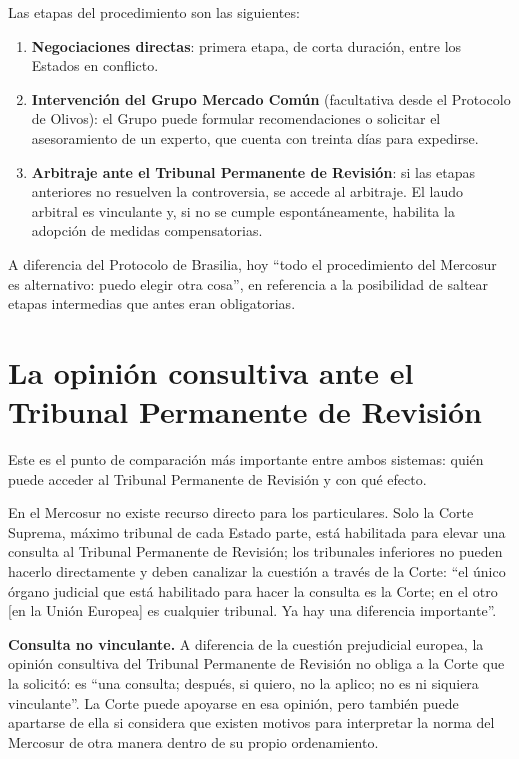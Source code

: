 \documentclass[12pt,oneside]{book}
\begin{document}
Las etapas del procedimiento son las siguientes:

\begin{enumerate}
    \item \textbf{Negociaciones directas}: primera etapa, de corta duración, entre los Estados en conflicto.
    \item \textbf{Intervención del Grupo Mercado Común} (facultativa desde el Protocolo de Olivos): el Grupo puede formular recomendaciones o solicitar el asesoramiento de un experto, que cuenta con treinta días para expedirse.
    \item \textbf{Arbitraje ante el Tribunal Permanente de Revisión}: si las etapas anteriores no resuelven la controversia, se accede al arbitraje. El laudo arbitral es vinculante y, si no se cumple espontáneamente, habilita la adopción de medidas compensatorias.
\end{enumerate}

A diferencia del Protocolo de Brasilia, hoy “todo el procedimiento del Mercosur es alternativo: puedo elegir otra cosa”, en referencia a la posibilidad de saltear etapas intermedias que antes eran obligatorias.

\section{La opinión consultiva ante el Tribunal Permanente de Revisión}

Este es el punto de comparación más importante entre ambos sistemas: quién puede acceder al Tribunal Permanente de Revisión y con qué efecto.

En el Mercosur no existe recurso directo para los particulares. Solo la Corte Suprema, máximo tribunal de cada Estado parte, está habilitada para elevar una consulta al Tribunal Permanente de Revisión; los tribunales inferiores no pueden hacerlo directamente y deben canalizar la cuestión a través de la Corte: “el único órgano judicial que está habilitado para hacer la consulta es la Corte; en el otro [en la Unión Europea] es cualquier tribunal. Ya hay una diferencia importante”.

\begin{important}
\textbf{Consulta no vinculante.} A diferencia de la cuestión prejudicial europea, la opinión consultiva del Tribunal Permanente de Revisión no obliga a la Corte que la solicitó: es “una consulta; después, si quiero, no la aplico; no es ni siquiera vinculante”. La Corte puede apoyarse en esa opinión, pero también puede apartarse de ella si considera que existen motivos para interpretar la norma del Mercosur de otra manera dentro de su propio ordenamiento.
\end{important}
\end{document}
